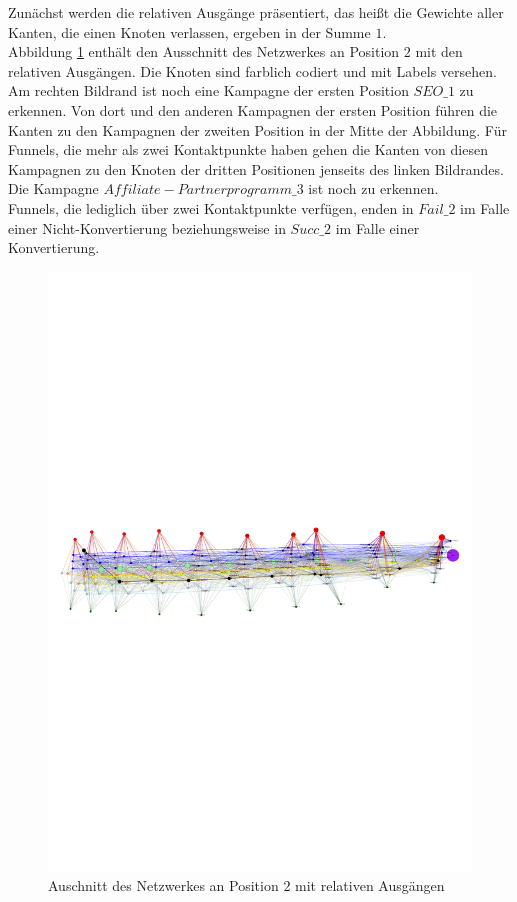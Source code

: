 Zunächst werden die relativen Ausgänge präsentiert, das heißt die Gewichte aller Kanten, die einen Knoten verlassen, ergeben in der Summe $1$.\\
Abbildung \ref{out_labels} enthält den Ausschnitt des Netzwerkes an Position $2$ mit den relativen Ausgängen. Die Knoten sind farblich codiert und mit Labels versehen. Am rechten Bildrand ist noch eine Kampagne der ersten Position $SEO\_1$ zu erkennen. Von dort und den anderen Kampagnen der ersten Position führen die Kanten zu den Kampagnen der zweiten Position in der Mitte der Abbildung. Für Funnels, die mehr als zwei Kontaktpunkte haben gehen die Kanten von diesen Kampagnen zu den Knoten der dritten Positionen jenseits des linken Bildrandes. Die Kampagne $Affiliate - Partnerprogramm\_3$ ist noch zu erkennen.\\
Funnels, die lediglich über zwei Kontaktpunkte verfügen, enden in $Fail\_2$ im Falle einer Nicht-Konvertierung beziehungsweise in $Succ\_2$ im Falle einer Konvertierung.
\begin{figure}[H]
	\centering\includegraphics[scale=2.5]{out_labels.pdf}\caption{Auschnitt des Netzwerkes an Position $2$ mit relativen Ausgängen}\label{out_labels}
\end{figure}
